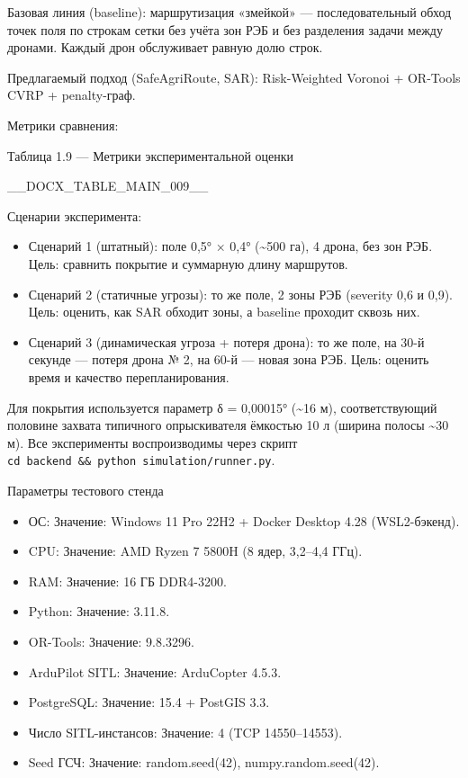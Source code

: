 \documentclass[14pt,a4paper]{extarticle}
\providecommand{\tightlist}{%
  \setlength{\itemsep}{0pt}\setlength{\parskip}{0pt}}
\begin{document}
Базовая линия (baseline): маршрутизация «змейкой» --- последовательный обход точек поля по строкам сетки без учёта зон РЭБ и без разделения задачи между дронами. Каждый дрон обслуживает равную долю строк.

Предлагаемый подход (SafeAgriRoute, SAR): Risk-Weighted Voronoi + OR-Tools CVRP + penalty-граф.

Метрики сравнения:

Таблица 1.9 --- Метрики экспериментальной оценки



__DOCX_TABLE_MAIN_009__



Сценарии эксперимента:

\begin{itemize}
\tightlist
\item
  Сценарий 1 (штатный): поле 0,5° × 0,4° (\textasciitilde500 га), 4 дрона, без зон РЭБ. Цель: сравнить покрытие и суммарную длину маршрутов.
\item
  Сценарий 2 (статичные угрозы): то же поле, 2 зоны РЭБ (severity 0,6 и 0,9). Цель: оценить, как SAR обходит зоны, а baseline проходит сквозь них.
\item
  Сценарий 3 (динамическая угроза + потеря дрона): то же поле, на 30-й секунде --- потеря дрона № 2, на 60-й --- новая зона РЭБ. Цель: оценить время и качество перепланирования.
\end{itemize}

Для покрытия используется параметр δ = 0,00015° (\textasciitilde16 м), соответствующий половине захвата типичного опрыскивателя ёмкостью 10 л (ширина полосы \textasciitilde30 м). Все эксперименты воспроизводимы через скрипт \texttt{cd\ backend\ \&\&\ python\ simulation/runner.py}.

Параметры тестового стенда
\begin{itemize}
\item ОС: Значение: Windows 11 Pro 22H2 + Docker Desktop 4.28 (WSL2-бэкенд).
\item CPU: Значение: AMD Ryzen 7 5800H (8 ядер, 3,2–4,4 ГГц).
\item RAM: Значение: 16 ГБ DDR4-3200.
\item Python: Значение: 3.11.8.
\item OR-Tools: Значение: 9.8.3296.
\item ArduPilot SITL: Значение: ArduCopter 4.5.3.
\item PostgreSQL: Значение: 15.4 + PostGIS 3.3.
\item Число SITL-инстансов: Значение: 4 (TCP 14550–14553).
\item Seed ГСЧ: Значение: random.seed(42), numpy.random.seed(42).
\end{itemize}
\end{document}
